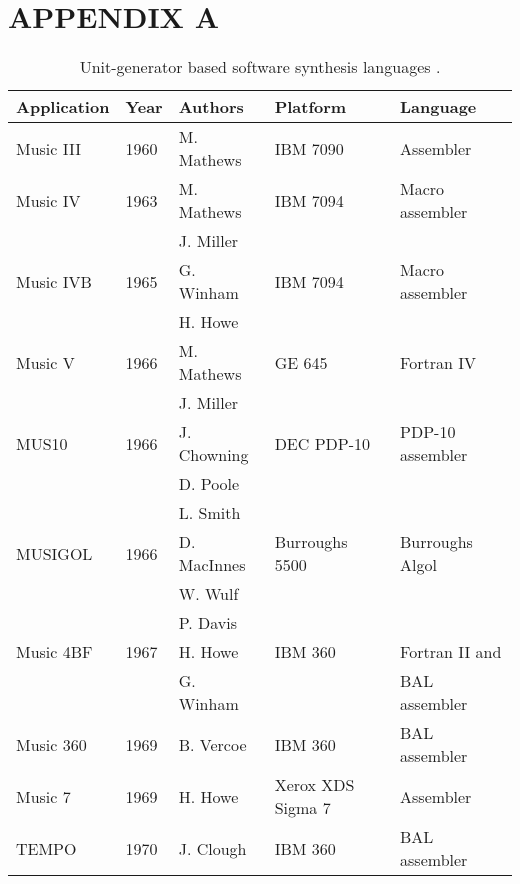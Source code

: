 \chapter{APPENDIX A}


\begin{table}[htbp]
	\caption{Unit­-generator ­based software synthesis languages \cite[789-790]{Roads1995}.}
	\centering
	\vspace{12pt}
	\begin{tabular}{ *{5}{l} }
		\hline
		Application & Year & Authors & Platform & Language \\
		\hline
		Music III & 1960 & M. Mathews & IBM 7090 & Assembler \\
		Music IV & 1963 & M. Mathews & IBM 7094 & Macro assembler \\
		& & J. Miller & & \\
		Music IVB & 1965 & G. Winham & IBM 7094 & Macro assembler \\
		& & H. Howe & & \\
		Music V & 1966 & M. Mathews & GE 645 & Fortran IV \\
		& & J. Miller & & \\
		MUS10 & 1966 & J. Chowning & DEC PDP­-10 & PDP­-10 assembler \\
		& & D. Poole & & \\
		& & L. Smith & & \\
		MUSIGOL & 1966 & D. MacInnes & Burroughs 5500 & Burroughs Algol \\
		& & W. Wulf & & \\
		& & P. Davis & & \\
		Music 4BF & 1967 & H. Howe & IBM 360 & Fortran II and \\
		& & G. Winham & & BAL assembler \\
		Music 360 & 1969 & B. Vercoe & IBM 360 & BAL assembler \\
		Music 7 & 1969 & H. Howe & Xerox XDS Sigma 7 & Assembler \\
		TEMPO & 1970 & J. Clough & IBM 360 & BAL assembler \\

\end{tabular}
\end{table}

